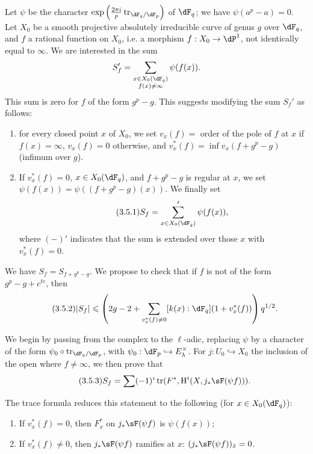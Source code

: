 Let $\psi$ be the character
$\exp\left(\frac{2\pi i}{p} \tr_{\dF_q/\dF_p}\right)$ of $\dF_q$; we have
$\psi(a^p-a)=0$. Let $X_0$ be a smooth projective absolutely
irreducible curve of genus $g$ over $\dF_q$, and $f$ a rational function on
$X_0$, i.e. a morphism $f:X_0 \to \dP^1$, not identically equal to
$\infty$. We are interested in the sum 
\[
  S_f' = \sum_{\substack{x\in X_0(\dF_q) \\ f(x)\ne \infty}} \psi(f(x)) 
  \text{.}
\]
This sum is zero for $f$ of the form $g^p-g$. This suggests
modifying the sum $S_f'$ as follows: 
\begin{enumerate}[\indent a)]
  \item for every closed point $x$ of $X_0$, we set $v_x(f) = $ order of the
    pole of $f$ at $x$ if $f(x)=\infty$, $v_x(f)=0$ otherwise, and
    $v_x^\ast(f) = \inf v_x(f+g^p-g)$ (infimum over $g$).
  \item If $v_x^\ast(f)=0$, $x\in X_0(\dF_q)$, and $f+g^p-g$ is
    regular at $x$, we set $\psi(f(x)) = \psi((f+g^p-g)(x))$. We finally set 
    \begin{equation*}\tag{3.5.1}\label{VI:eq:3-5-1}
      S_f = \sum'_{x\in X_0(\dF_q)} \psi(f(x)) \text{,}
    \end{equation*}
    where $(-)'$ indicates that the sum is extended over those $x$ with
    $v_x^\ast(f)=0$.
\end{enumerate}

We have $S_f=S_{f+g^p-g}$. We propose to check that if $f$ is not of the
form $g^p-g+c^{t e}$, then 
\begin{equation*}\tag{3.5.2}\label{VI:eq:3-5-2}
  |S_f|\leqslant \left(2 g-2+\sum_{v_x^\ast(f)\ne 0} [k(x):\dF_q] (1+v_x^\ast(f))\right) q^{1/2} \text{.}
\end{equation*}

We begin by passing from the complex to the $\ell$-adic, replacing $\psi$ by
a character of the form $\psi_0\circ \tr_{\dF_q/\dF_p}$, with
$\psi_0:\dF_p\hookrightarrow E_\lambda^\times$. For $j:U_0\hookrightarrow X_0$
the inclusion of the open where $f\ne\infty$, we then prove that 
\begin{equation*}\tag{3.5.3}\label{VI:eq:3-5-3}
  S_f = \sum (-1)^i \tr(F^\ast,\h^i(X,j_\ast \sF(\psi f))) \text{.} 
\end{equation*}

The trace formula reduces this statement to the following (for
$x\in X_0(\dF_q)$): 
\begin{enumerate}[\indent a)]
  \item If $v_x^\ast(f)=0$, then $F_x^\ast$ on $j_\ast \sF(\psi f)$ is
    $\psi(f(x))$;
  \item If $v_x^\ast(f)\ne 0$, then $j_\ast \sF(\psi f)$ ramifies at $x$:
    $(j_\ast \sF(\psi f))_{\bar x}=0$.
\end{enumerate}

